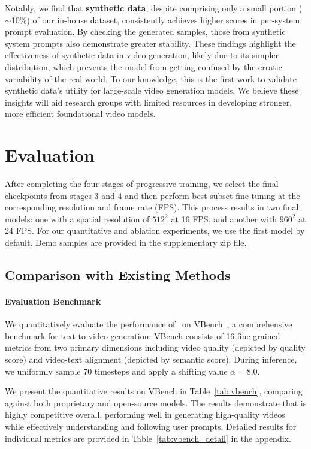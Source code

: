 Notably, we find that \textbf{synthetic data}, despite comprising only a small portion ($\sim$10\%) of our in-house dataset, consistently achieves higher scores in per-system prompt evaluation. By checking the generated samples, those from synthetic system prompts also demonstrate greater stability. These findings highlight the effectiveness of synthetic data in video generation, likely due to its simpler distribution, which prevents the model from getting confused by the erratic variability of the real world. To our knowledge, this is the first work to validate synthetic data's utility for large-scale video generation models. We believe these insights will aid research groups with limited resources in developing stronger, more efficient foundational video models.


\section{Evaluation}

After completing the four stages of progressive training, we select the final checkpoints from stages 3 and 4 and then perform best-subset fine-tuning at the corresponding resolution and frame rate (FPS). This process results in two final models: one with a spatial resolution of \( 512^2 \) at 16 FPS, and another with \( 960^2 \) at 24 FPS. For our quantitative and ablation experiments, we use the first model by default. Demo samples are provided in the supplementary zip file.
\subsection{Comparison with Existing Methods}

\paragraph{Evaluation Benchmark} We quantitatively evaluate the performance of~\sysname{} on VBench~\citep{vbench}, a comprehensive benchmark for text-to-video generation. VBench consists of 16 fine-grained metrics from two primary dimensions including video quality (depicted by quality score) and video-text alignment (depicted by semantic score). During inference, we uniformly sample 70 timesteps and apply a shifting value $\alpha=8.0$. 

We present the quantitative results on VBench in Table~\ref{tab:vbench}, comparing \sysname{} against both proprietary and open-source models. The results demonstrate that \sysname{} is highly competitive overall, performing well in generating high-quality videos while effectively understanding and following user prompts. Detailed results for individual metrics are provided in Table~\ref{tab:vbench_detail} in the appendix.

